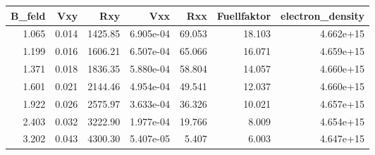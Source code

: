 \begin{tabular}{rrrrrrr}
\toprule
 B\_feld &    Vxy &      Rxy &        Vxx &     Rxx &  Fuellfaktor &  electron\_density \\
\midrule
  1.065 &  0.014 &  1425.85 &  6.905e-04 &  69.053 &       18.103 &         4.662e+15 \\
  1.199 &  0.016 &  1606.21 &  6.507e-04 &  65.066 &       16.071 &         4.659e+15 \\
  1.371 &  0.018 &  1836.35 &  5.880e-04 &  58.804 &       14.057 &         4.660e+15 \\
  1.601 &  0.021 &  2144.46 &  4.954e-04 &  49.541 &       12.037 &         4.660e+15 \\
  1.922 &  0.026 &  2575.97 &  3.633e-04 &  36.326 &       10.021 &         4.657e+15 \\
  2.403 &  0.032 &  3222.90 &  1.977e-04 &  19.766 &        8.009 &         4.654e+15 \\
  3.202 &  0.043 &  4300.30 &  5.407e-05 &   5.407 &        6.003 &         4.647e+15 \\
\bottomrule
\end{tabular}
